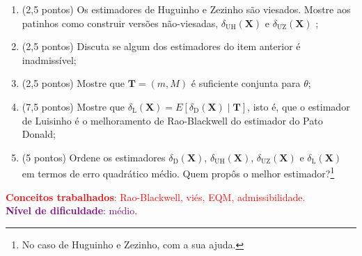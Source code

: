\documentclass[a4paper,10pt, notitlepage]{report}
\newcommand{\bX}{\boldsymbol{X}} %
\begin{document}
\begin{enumerate}[label=\alph*)]
 \item (2,5 pontos) Os estimadores de Huguinho e Zezinho são viesados.
 Mostre aos patinhos como construir versões não-viesadas, $\delta_{\text{UH}}(\bX)$ e $\delta_{\text{UZ}}(\bX)$ ;
 \item (2,5  pontos) Discuta se algum dos estimadores do item anterior é inadmissível;
 \item (2,5  pontos) Mostre que $\boldsymbol{T} = (m, M)$ é suficiente conjunta para $\theta$;  
 \item (7,5 pontos) Mostre que $\delta_{\text{L}}(\bX) = E\left[\delta_{\text{D}}(\bX) \mid \boldsymbol{T}\right]$, isto é, que o estimador de Luisinho é o melhoramento de Rao-Blackwell do estimador do Pato Donald;
 \item (5 pontos) Ordene os estimadores $\delta_{\text{D}}(\bX)$, $\delta_{\text{UH}}(\bX)$, $\delta_{\text{UZ}}(\bX)$ e $\delta_{\text{L}}(\bX)$ em termos de erro quadrático médio.
 Quem propôs o melhor estimador?\footnote{No caso de Huguinho e Zezinho, com a sua ajuda.} 
\end{enumerate}
\textcolor{red}{\textbf{Conceitos trabalhados}: Rao-Blackwell, viés, EQM, admissibilidade.}
\\
\textcolor{purple}{\textbf{Nível de dificuldade}: médio.}
\\
\end{document}
